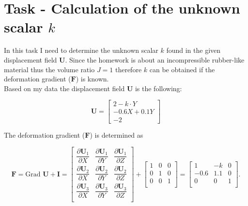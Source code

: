 \documentclass[12pt]{article}
\begin{document}
\newpage
\section{Task - Calculation of the unknown scalar $k$}

\noindent In this task I need to determine the unknown scalar $k$ found in the given displacement field $\textbf{U}$. Since the homework is about an incompressible rubber-like material thus the volume ratio $J=1$ therefore $k$ can be obtained if the deformation gradient ($\textbf{F}$) is known. \\

Based on my data the displacement field $\textbf{U}$ is the following:

\begin{equation}
  \textbf{U} = \begin{bmatrix}
    2 - k \cdot Y \\
    -0.6 X + 0.1 Y \\
    -2
  \end{bmatrix}
\end{equation}

The deformation gradient ($\textbf{F}$) is determined as

\begin{equation}
  \textbf{F} = \text{Grad } \textbf{U} + \textbf{I} =     \begin{bmatrix}
    \dfrac{\partial \textbf{U}_{1}}{\partial X} & \dfrac{\partial \textbf{U}_{1}}{\partial Y} & \dfrac{\partial \textbf{U}_{1}}{\partial Z} \\[0.4 cm]
    \dfrac{\partial \textbf{U}_{2}}{\partial X} & \dfrac{\partial \textbf{U}_{2}}{\partial Y} & \dfrac{\partial \textbf{U}_{2}}{\partial Z} \\[0.4 cm]
    \dfrac{\partial \textbf{U}_{3}}{\partial X} & \dfrac{\partial \textbf{U}_{3}}{\partial Y} & \dfrac{\partial \textbf{U}_{3}}{\partial Z} \\
\end{bmatrix}
+     \begin{bmatrix}
  1 & 0 & 0\\
  0 & 1 & 0\\
  0 & 0 & 1\\
\end{bmatrix} = \begin{bmatrix}
  1 & -k & 0\\
  -0.6 & 1.1 & 0 \\
  0 & 0 & 1 \\
\end{bmatrix}.
\end{equation}
\end{document}
